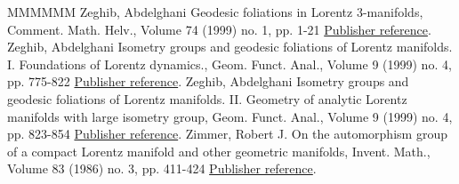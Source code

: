 \documentclass[11pt]{article}
\theoremstyle{definition}
\numberwithin{equation}{section}
\numberwithin{figure}{section}
\numberwithin{table}{section}
\begin{document}
\begin{thebibliography}{MMMMMM}
 Zeghib, Abdelghani Geodesic foliations in Lorentz 3-manifolds, Comment. Math. Helv., Volume 74 (1999) no. 1, pp. 1-21 \href{https://ahl.centre-mersenne.org/item/AHL_2020__3__407_0/#zeghibfoliation}{Publisher reference}.
 Zeghib, Abdelghani Isometry groups and geodesic foliations of Lorentz manifolds. I. Foundations of Lorentz dynamics., Geom. Funct. Anal., Volume 9 (1999) no. 4, pp. 775-822 \href{https://ahl.centre-mersenne.org/item/AHL_2020__3__407_0/#zeghibisom1}{Publisher reference}.
 Zeghib, Abdelghani Isometry groups and geodesic foliations of Lorentz manifolds. II. Geometry of analytic Lorentz manifolds with large isometry group, Geom. Funct. Anal., Volume 9 (1999) no. 4, pp. 823-854 \href{https://ahl.centre-mersenne.org/item/AHL_2020__3__407_0/#zeghibisom2}{Publisher reference}.
 Zimmer, Robert J. On the automorphism group of a compact Lorentz manifold and other geometric manifolds, Invent. Math., Volume 83 (1986) no. 3, pp. 411-424 \href{https://ahl.centre-mersenne.org/item/AHL_2020__3__407_0/#zimmer.iso}{Publisher reference}.
\end{thebibliography}
\end{document}

